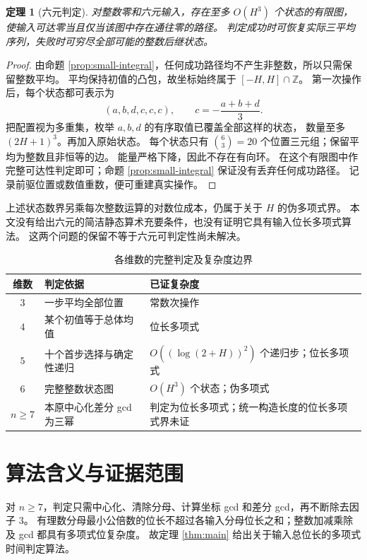 \documentclass[UTF8,fontset=fandol,zihao=-4,a4paper]{ctexart}
\numberwithin{equation}{section}
\newtheorem{theorem}{定理}[section]
\theoremstyle{definition}
\newcommand{\Z}{\mathbb Z}
\begin{document}
\begin{theorem}[六元判定]\label{thm:six}
对整数零和六元输入，存在至多 $O(H^3)$ 个状态的有限图，
使输入可达零当且仅当该图中存在通往零的路径。
判定成功时可恢复实际三平均序列，失败时可穷尽全部可能的整数后继状态。
\end{theorem}
\begin{proof}
由命题 \ref{prop:small-integral}，任何成功路径均不产生非整数，所以只需保留整数平均。
平均保持初值的凸包，故坐标始终属于 $[-H,H]\cap\Z$。
第一次操作后，每个状态都可表示为
\[
 (a,b,d,c,c,c),\qquad c=-\frac{a+b+d}{3}.
\]
把配置视为多重集，枚举 $a,b,d$ 的有序取值已覆盖全部这样的状态，
数量至多 $(2H+1)^3$。再加入原始状态。
每个状态只有 $\binom63=20$ 个位置三元组；保留平均为整数且非恒等的边。
能量严格下降，因此不存在有向环。
在这个有限图中作完整可达性判定即可；命题 \ref{prop:small-integral} 保证没有丢弃任何成功路径。
记录前驱位置或数值重数，便可重建真实操作。
\end{proof}

上述状态数界另乘每次整数运算的对数位成本，仍属于关于 $H$ 的伪多项式界。
本文没有给出六元的简洁静态算术充要条件，也没有证明它具有输入位长多项式算法。
这两个问题的保留不等于六元可判定性尚未解决。

\begin{table}[htbp]
\centering\small
\caption{各维数的完整判定及复杂度边界}\label{tab:dimension-summary}
\begin{tabular}{cp{}p{}}
\toprule 维数 & 判定依据 & 已证复杂度\\\midrule
$3$ & 一步平均全部位置 & 常数次操作\\
$4$ & 某个初值等于总体均值 & 位长多项式\\
$5$ & 十个首步选择与确定性递归 & $O((\log(2+H))^2)$ 个递归步；位长多项式\\
$6$ & 完整整数状态图 & $O(H^3)$ 个状态；伪多项式\\
$n\ge7$ & 本原中心化差分 gcd 为三幂 & 判定为位长多项式；统一构造长度的位长多项式界未证\\
\bottomrule
\end{tabular}
\end{table}

\section{算法含义与证据范围}\label{sec:algorithm}

对 $n\ge7$，判定只需中心化、清除分母、计算坐标 gcd 和差分 gcd，再不断除去因子 $3$。
有理数分母最小公倍数的位长不超过各输入分母位长之和；整数加减乘除及 gcd 都具有多项式位复杂度。
故定理 \ref{thm:main} 给出关于输入总位长的多项式时间判定算法。
\end{document}
